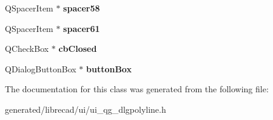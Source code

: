 \begin{DoxyCompactItemize}
\item 
\hypertarget{classUi__QG__DlgPolyline_adc71c7ba1b257e08c98c27cc7ee3816c}{Q\-Spacer\-Item $\ast$ {\bfseries spacer58}}\label{classUi__QG__DlgPolyline_adc71c7ba1b257e08c98c27cc7ee3816c}

\item 
\hypertarget{classUi__QG__DlgPolyline_a79bef24db38957535c0ee009ff4f5ca4}{Q\-Spacer\-Item $\ast$ {\bfseries spacer61}}\label{classUi__QG__DlgPolyline_a79bef24db38957535c0ee009ff4f5ca4}

\item 
\hypertarget{classUi__QG__DlgPolyline_a5edeaef480ee76362d4edeb51bb27144}{Q\-Check\-Box $\ast$ {\bfseries cb\-Closed}}\label{classUi__QG__DlgPolyline_a5edeaef480ee76362d4edeb51bb27144}

\item 
\hypertarget{classUi__QG__DlgPolyline_aeee729c371722055035f2f61c0e91214}{Q\-Dialog\-Button\-Box $\ast$ {\bfseries button\-Box}}\label{classUi__QG__DlgPolyline_aeee729c371722055035f2f61c0e91214}

\end{DoxyCompactItemize}


The documentation for this class was generated from the following file\-:\begin{DoxyCompactItemize}
\item 
generated/librecad/ui/ui\-\_\-qg\-\_\-dlgpolyline.\-h\end{DoxyCompactItemize}
